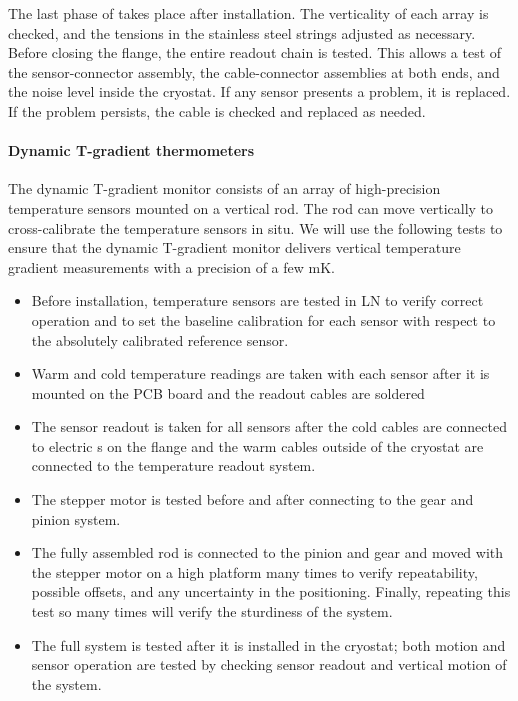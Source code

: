 The last phase of  takes place after installation. 
The verticality of each array %
is checked, and the tensions in the stainless steel strings adjusted as necessary.
Before closing the flange, the entire readout chain is %
tested.  
This allows a test of the sensor-connector assembly, the cable-connector assemblies at both ends, and the noise level inside the cryostat.
If any sensor presents a problem, it is replaced. If the problem persists, the cable is checked and replaced as needed.

\paragraph{Dynamic T-gradient thermometers}
\label{sec:fdgen-slow-cryo-qc-thdy}

The dynamic T-gradient monitor consists of an array of high-precision temperature sensors mounted on a vertical rod. The rod can move vertically to cross-calibrate the temperature sensors in situ. %
We will use the following %
tests to ensure that the dynamic T-gradient monitor delivers vertical temperature gradient measurements with a precision of a few \si{mK}.

\begin{itemize}
\item
Before installation, temperature sensors are tested in LN to verify correct operation and to set the baseline calibration for each sensor with respect to the absolutely calibrated reference sensor. 
\item
Warm and cold temperature readings are taken with each sensor after it is mounted on the PCB board and the readout cables are soldered %
\item
The sensor readout is taken for all sensors after the cold cables are connected to electric \fdth{}s on the flange and the warm cables outside of the cryostat are connected to the temperature readout system.
\item 
The stepper motor is tested before and after connecting to the gear and pinion system.
\item
The fully assembled rod is connected to the pinion and gear and moved with the stepper motor on a high platform many times to verify repeatability, possible offsets, and any uncertainty in the positioning. Finally, repeating this test so many times will verify the sturdiness of the system.
\item
The full system is tested after it is installed in the cryostat; both motion and sensor operation are tested by checking %
sensor readout and vertical motion of the system.
\end{itemize} 

